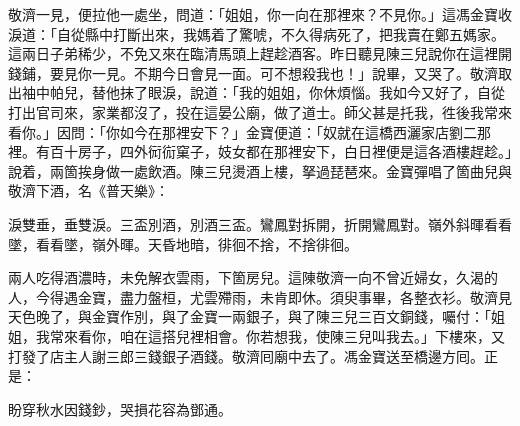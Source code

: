 敬濟一見，便拉他一處坐，問道：「姐姐，你一向在那裡來？不見你。」這馮金寶收淚道：「自從縣中打斷出來，我媽着了驚唬，不久得病死了，把我賣在鄭五媽家。這兩日子弟稀少，不免又來在臨清馬頭上趕趁酒客。昨日聽見陳三兒說你在這裡開錢鋪，要見你一見。不期今日會見一面。可不想殺我也！」說畢，又哭了。敬濟取出袖中帕兒，替他抹了眼淚，說道：「我的姐姐，你休煩惱。我如今又好了，{}自從打出官司來，家業都沒了，投在這晏公廟，做了道士。師父甚是托我，徃後我常來看你。」因問：「你如今在那裡安下？」金寶便道：「奴就在這橋西灑家店劉二那裡。有百十房子，四外衏䘕窠子，妓女都在那裡安下，白日裡便是這各酒樓趕趁。」說着，兩箇挨身做一處飲酒。陳三兒燙酒上樓，拏過琵琶來。金寶彈唱了箇曲兒與敬濟下酒，名《普天樂》：

淚雙垂，垂雙淚。三盃別酒，別酒三盃。鸞鳳對拆開，折開鸞鳳對。嶺外斜暉看看墜，看看墜，嶺外暉。天昏地暗，徘徊不捨，不捨徘徊。

兩人吃得酒濃時，未免解衣雲雨，下箇房兒。這陳敬濟一向不曾近婦女，久渴的人，今得遇金寶，盡力盤桓，尤雲殢雨，未肯即休。須臾事畢，各整衣衫。敬濟見天色晚了，與金寶作別，與了金寶一兩銀子，與了陳三兒三百文銅錢，囑付：「姐姐，我常來看你，咱在這搭兒裡相會。你若想我，使陳三兒叫我去。」{}下樓來，又打發了店主人謝三郎三錢銀子酒錢。敬濟囘廟中去了。馮金寶送至橋邊方囘。正是：

盼穿秋水因錢鈔，哭損花容為鄧通。

